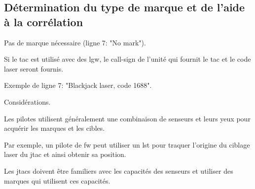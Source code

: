 \subsection{Détermination du type de marque et de l'aide à la corrélation}

\begin{e1}
	
	
	\begin{e2}
		\item Pas de marque nécessaire (ligne 7: "No mark").
		
		\item Si le \gls{tac} est utilisé avec des \gls{lgw}, le call-sign de l'unité qui fournit le \gls{tac} et le code laser seront fournis.
		
		Exemple de ligne 7: "Blackjack laser, code 1688".
	\end{e2}
	
	
	
	\begin{e2}
		
		
		\item{Considérations.}{}
		
		\begin{e3}
			\item Les pilotes utilisent généralement une combinaison de senseurs et leurs yeux pour acquérir les marques et les cibles.
			
			Par exemple, un pilote de \gls{fw} peut utiliser un \gls{lst} pour traquer l'origine du ciblage laser du \gls{jtac} et ainsi obtenir sa position.
			
			Les \glspl{jtac} doivent être familiers avec les capacités des senseurs et utiliser des marques qui utilisent ces capacités.
			

\end{e3}
\end{e2}
\end{e1}

